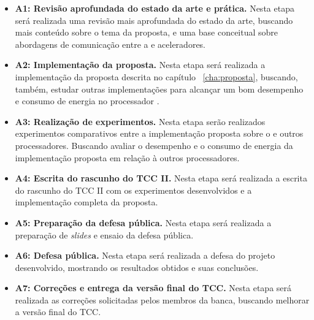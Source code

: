\begin{itemize}
    \item \textbf{A1: Revisão aprofundada do estado da arte e prática.} Nesta etapa será
        realizada uma revisão mais aprofundada do estado da arte, buscando mais
        conteúdo sobre o tema da proposta, e uma base conceitual sobre abordagens de
        comunicação entre a \cpu e aceleradores.
    \item \textbf{A2: Implementação da proposta.} Nesta etapa será realizada a
        implementação da proposta descrita no capítulo ~\ref{cha:proposta},
        buscando, também, estudar outras implementações para alcançar um bom
        desempenho e consumo de energia no processador \mppa.
    \item \textbf{A3: Realização de experimentos.} Nesta etapa serão realizados
        experimentos comparativos entre a implementação proposta sobre o \mppa e
        outros processadores. Buscando avaliar o desempenho e o consumo de
        energia da implementação proposta em relação à outros processadores.
    \item \textbf{A4: Escrita do rascunho do TCC II.} Nesta etapa será realizada
        a escrita do rascunho do TCC II com os experimentos desenvolvidos e a
        implementação completa da proposta.
    \item \textbf{A5: Preparação da defesa pública.} Nesta etapa será realizada
        a preparação de \textit{slides} e ensaio da defesa pública.
    \item \textbf{A6: Defesa pública.} Nesta etapa será realizada a defesa do
        projeto desenvolvido, mostrando os resultados obtidos e suas conclusões.
    \item \textbf{A7: Correções e entrega da versão final do TCC.} Nesta etapa
        será realizada as correções solicitadas pelos membros da banca, buscando
        melhorar a versão final do TCC.
\end{itemize}

